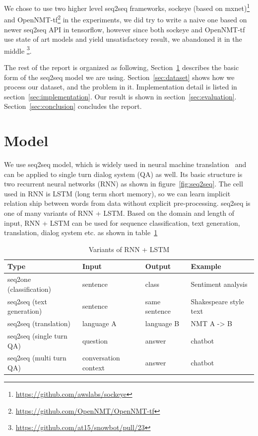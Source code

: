 \documentclass{article}
\begin{document}
We chose to use two higher level seq2seq frameworks, sockeye (based on mxnet)\footnote{\url{https://github.com/awslabs/sockeye}}
and OpenNMT-tf\footnote{\url{https://github.com/OpenNMT/OpenNMT-tf}} in the experiments,
we did try to write a naive one based on newer seq2seq API in tensorflow, however since both sockeye and OpenNMT-tf use state of art models
and yield unsatisfactory result, we abandoned it in the middle \footnote{\url{https://github.com/at15/snowbot/pull/23}}.

The rest of the report is organized as following, Section~\ref{sec:model} describes the basic form of the seq2seq model we are using.
Section~\ref{sec:dataset} shows how we process our dataset, and the problem in it.
Implementation detail is listed in section~\ref{sec:implementation}.
Our result is shown in section~\ref{sec:evaluation}.
Section~\ref{sec:conclusion} concludes the report.

\section{Model}
\label{sec:model}

We use seq2seq model, which is widely used in neural machine translation~\cite{sutskever2014sequence}
and can be applied to single turn dialog system (QA) as well.
Its basic structure is two recurrent neural networks (RNN) as shown in figure~\ref{fig:seq2seq}.
The cell used in RNN is LSTM (long term short memory),
so we can learn implicit relation ship between words from data without explicit pre-processing.
seq2seq is one of many variants of RNN + LSTM. Based on the domain and length of input,
RNN + LSTM can be used for sequence classification, text generation, translation, dialog system etc.
as shown in table~\ref{table:RNN+LSTM}

\begin{table}[h]
    \caption{Variants of RNN + LSTM}
    \label{table:RNN+LSTM}
    \centering
    \begin{tabular}{llll}
        \toprule
        Type & Input & Output & Example \\
        \midrule
        seq2one (classification) & sentence & class & Sentiment analysis \\
        seq2seq (text generation) & sentence & same sentence & Shakespeare style text \\
        seq2seq (translation) & language A & language B & NMT A -> B \\
        seq2seq (single turn QA) & question & answer & chatbot \\
        seq2seq (multi turn QA) & conversation context & answer & chatbot \\
        \bottomrule
    \end{tabular}
\end{table}
\end{document}
